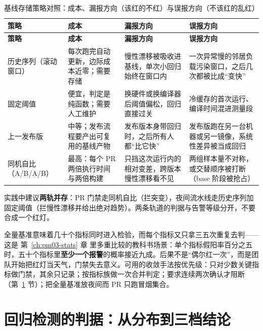 \documentclass[12pt,a4paper,fontset=fandol]{ctexbook}
\begin{document}
\begin{longtable}{|>{\raggedright\arraybackslash}p{}|>{\raggedright\arraybackslash}p{}|>{\raggedright\arraybackslash}p{}|>{\raggedright\arraybackslash}p{}|}
\caption{基线存储策略对照：成本、漏报方向（该红的不红）与误报方向（不该红的乱红）}
\label{tab:pm13-baseline}\\
\hline
\textbf{策略} & \textbf{成本} & \textbf{漏报方向} & \textbf{误报方向}\\
\hline
\endfirsthead
\hline
\textbf{策略} & \textbf{成本} & \textbf{漏报方向} & \textbf{误报方向}\\
\hline
\endhead
历史序列（滚动窗口） & 每次跑完自动更新，边际成本近零；需要存储 &
慢性漂移被吸收进基线，单次小回归始终在窗口内 &
一次异常慢的邻居负载污染窗口，之后几次都被比成``变快''\\
\hline
固定阈值 & 便宜，判定是纯函数；需要人工维护 &
换硬件或换编译器后阈值偏松，回归直接过关 &
冷缓存的首次运行、编译时间混进测量段\\
\hline
上一发布版 & 中等；发布流程要产出可复用的基线产物 &
发布版本身带回归时，之后所有人都``比它快'' &
发布版跑在另一台机器或另一镜像，系统性差异被当成回归\\
\hline
同机自比（A/B/A/B） & 最高：每个 PR 两倍执行时间与两倍构建 &
只挡这次运行内的相对变差，跨版本慢性漂移看不见 &
两组样本量不对称，或交替顺序被打断（base 阶段被抢占）\\
\hline
\end{longtable}

实践中建议\textbf{两轨并存}：PR 门禁走同机自比（拦突变），夜间流水线走历史序列加固定阈值（拦慢性漂移并给出绝对趋势）。两条轨道的判据与告警等级分开，不要合成一个红灯。

\begin{note}[title={为什么``每个 PR 都跑全量基准''会退化成噪声计数器}]
\label{box:pm13-noise-counter}
全量基准意味着几十个指标同时进入检验，而每个指标又只拿三五次重复去判——这是 第~\ref{ch:pm03-stats} 章 里多重比较的教科书场景：单个指标假阳率百分之五时，五十个指标里\textbf{至少一个报警}的概率接近九成。后果不是``偶尔红一次''，而是团队开始把红灯当天气，门禁失去意义。可用的收敛手法按优先级：只对少数关键指标做门禁，其余只记录；按指标族做一次合并判定；要求连续两次确认才阻断（第~\ref{sec:pm13-verdict} 节）；把全量基准放夜间而 PR 只跑冒烟集合。
\end{note}

\section{回归检测的判据：从分布到三档结论}
\label{sec:pm13-verdict}
\end{document}
